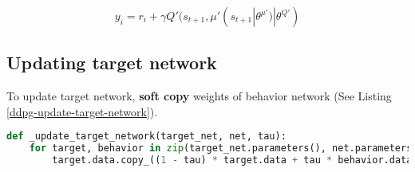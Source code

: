 \begin{equation}\label{ddpg-update-behavior-network-eqn}
    y_i = r_i + \gamma Q'(s_{t + 1}, \mu'(s_{t + 1} | \theta^{\mu'}) | \theta^{Q'})
\end{equation}

\subsection{Updating target network}
\indent
    To update target network, \textbf{soft copy} weights of behavior network (See Listing \ref{ddpg-update-target-network}).

\begin{lstlisting}[language=Python, caption={Python code of \textcolor{blue}{\textbf{\_update\_target\_network}} of DDPG.}, label={ddpg-update-target-network}]
def _update_target_network(target_net, net, tau):
    for target, behavior in zip(target_net.parameters(), net.parameters()):
        target.data.copy_((1 - tau) * target.data + tau * behavior.data)\end{lstlisting}